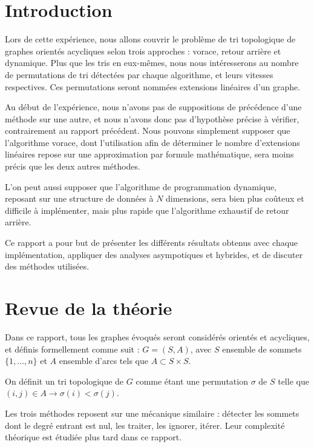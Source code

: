 \documentclass[10pt,a4paper]{article}
\begin{document}
\newpage

\hfill

\newpage

\tableofcontents

\newpage

\section{Introduction}

Lors de cette expérience, nous allons couvrir le problème de tri topologique de graphes orientés acycliques selon trois approches : vorace, retour arrière et dynamique. Plus que les tris en eux-mêmes, nous nous intéresserons au nombre de permutations de tri détectées par chaque algorithme, et leurs vitesses respectives. Ces permutations seront nommées \og extensions linéaires \fg d'un graphe.

Au début de l'expérience, nous n'avons pas de suppositions de précédence d'une méthode sur une autre, et nous n'avons donc pas d'hypothèse précise à vérifier, contrairement au rapport précédent. Nous pouvons simplement supposer que l'algorithme vorace, dont l'utilisation afin de déterminer le nombre d'extensions linéaires repose sur une approximation par formule mathématique, sera moins précis que les deux autres méthodes.

L'on peut aussi supposer que l'algorithme de programmation dynamique, reposant sur une structure de données à $N$ dimensions, sera bien plus coûteux et difficile à implémenter, mais plus rapide que l'algorithme exhaustif de retour arrière.

Ce rapport a pour but de présenter les différents résultats obtenus avec chaque implémentation, appliquer des analyses asympotiques et hybrides, et de discuter des méthodes utilisées.

\section{Revue de la théorie}

Dans ce rapport, tous les graphes évoqués seront considérés orientés et acycliques, et définis formellement comme suit : $ G = (S,A) $, avec $S$ ensemble de sommets $\{1, \ldots, n\}$ et $A$ ensemble d'arcs tels que $ A \subset S \times S $.

On définit un tri topologique de $G$ comme étant une permutation $ \sigma $ de $ S $ telle que $ (i,j) \in A \longrightarrow \sigma(i) < \sigma(j) $.

Les trois méthodes reposent sur une mécanique similaire : détecter les sommets dont le degré entrant est nul, les traiter, les ignorer, itérer. Leur complexité théorique est étudiée plus tard dans ce rapport.
\end{document}
